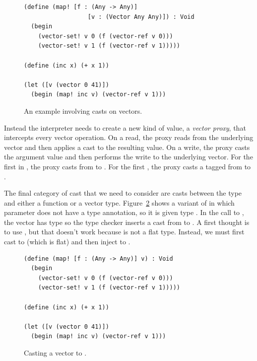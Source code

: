 \documentclass[7x10]{TimesAPriori_MIT}%
\begin{document}
\begin{figure}[tbp]
\begin{lstlisting}
(define (map! [f : (Any -> Any)]
                  [v : (Vector Any Any)]) : Void
  (begin
    (vector-set! v 0 (f (vector-ref v 0)))
    (vector-set! v 1 (f (vector-ref v 1)))))

(define (inc x) (+ x 1))

(let ([v (vector 0 41)])
  (begin (map! inc v) (vector-ref v 1)))
\end{lstlisting}
\caption{An example involving casts on vectors.}
\label{fig:map-bang}
\end{figure}

Instead the interpreter needs to create a new kind of value, a
\emph{vector proxy}, that intercepts every vector operation. On a
read, the proxy reads from the underlying vector and then applies a
cast to the resulting value.  On a write, the proxy casts the argument
value and then performs the write to the underlying vector. For the
first  in , the proxy casts
 from  to .  For the first
, the proxy casts a tagged  from 
to .

The final category of cast that we need to consider are casts between
the  type and either a function or a vector
type. Figure~\ref{fig:map-any} shows a variant of 
in which parameter  does not have a type annotation, so it is
given type . In the call to , the vector has
type  so the type checker inserts a
cast from  to . A first
thought is to use , but that doesn't work because
 is not a flat type. Instead, we must
first cast to  (which is flat) and then inject
to .

\begin{figure}[tbp]
\begin{lstlisting}
(define (map! [f : (Any -> Any)] v) : Void
  (begin
    (vector-set! v 0 (f (vector-ref v 0)))
    (vector-set! v 1 (f (vector-ref v 1)))))

(define (inc x) (+ x 1))

(let ([v (vector 0 41)])
  (begin (map! inc v) (vector-ref v 1)))
\end{lstlisting}
\caption{Casting a vector to .}
\label{fig:map-any}
\end{figure}
\end{document}
